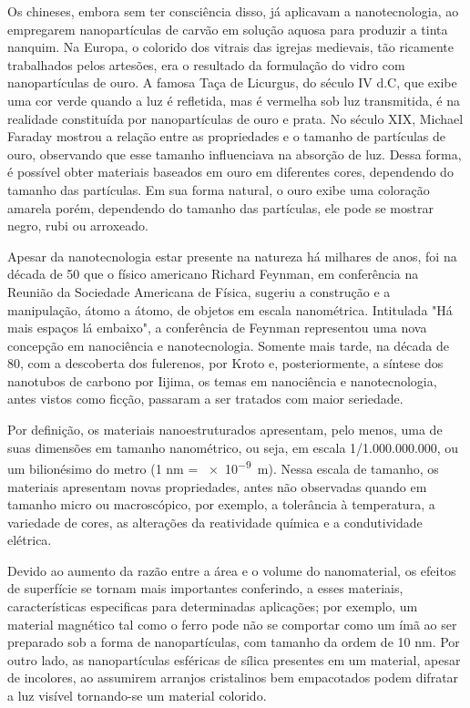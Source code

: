 \documentclass[10pt]{scrartcl}
\begin{document}
Os chineses, embora sem ter consciência disso, já aplicavam a nanotecnologia, ao empregarem nanopartículas de carvão em solução aquosa para produzir a tinta nanquim. Na Europa, o colorido dos vitrais das igrejas medievais, tão ricamente trabalhados pelos artesões, era o resultado da formulação do vidro com nanopartículas de ouro. A famosa Taça de Licurgus, do século IV d.C, que exibe uma cor verde quando a luz é refletida, mas é vermelha sob luz transmitida, é na realidade constituída por nanopartículas de ouro e prata. No século XIX, Michael Faraday mostrou a relação entre as propriedades e o tamanho de partículas de ouro, observando que esse tamanho influenciava na absorção de luz. Dessa forma, é possível obter materiais baseados em ouro em diferentes cores, dependendo do tamanho das partículas. Em sua forma natural, o ouro exibe uma coloração amarela porém, dependendo do tamanho das partículas, ele pode se mostrar negro, rubi ou arroxeado.

Apesar da nanotecnologia estar presente na natureza há milhares de anos, foi na década de 50 que o físico americano Richard Feynman, em conferência na Reunião da Sociedade Americana de Física, sugeriu a construção e a manipulação, átomo a átomo, de objetos em escala nanométrica. Intitulada "Há mais espaços lá embaixo", a conferência de Feynman representou uma nova concepção em nanociência e nanotecnologia. Somente mais tarde, na década de 80, com a descoberta dos fulerenos, por Kroto e, posteriormente, a síntese dos nanotubos de carbono por Iijima, os temas em nanociência e nanotecnologia, antes vistos como ficção, passaram a ser tratados com maior seriedade.

Por definição, os materiais nanoestruturados apresentam, pelo menos, uma de suas dimensões em tamanho nanométrico, ou seja, em escala 1/1.000.000.000, ou um bilionésimo do metro (1 nm = \num{e-9} m). Nessa escala de tamanho, os materiais apresentam novas propriedades, antes não observadas quando em tamanho micro ou macroscópico, por exemplo, a tolerância à temperatura, a variedade de cores, as alterações da reatividade química e a condutividade elétrica.

Devido ao aumento da razão entre a área e o volume do nanomaterial, os efeitos de superfície se tornam mais importantes conferindo, a esses materiais, características especificas para determinadas aplicações; por exemplo, um material magnético tal como o ferro pode não se comportar como um ímã ao ser preparado sob a forma de nanopartículas, com tamanho da ordem de 10 nm. Por outro lado, as nanopartículas esféricas de sílica presentes em um material, apesar de incolores, ao assumirem arranjos cristalinos bem empacotados podem difratar a luz visível tornando-se um material colorido.
\end{document}
